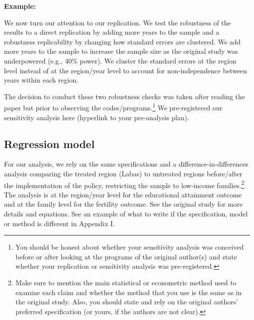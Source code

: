 \documentclass[12pt,a4paper]{article}
\begin{document}

\textbf{Example:} 

We now turn our attention to our replication. We test the robustness of the results to a direct replication by adding more years to the sample and a robustness replicability by changing how standard errors are clustered. We add more years to the sample to increase the sample size as the original study was underpowered (e.g., 40\% power). We cluster the standard errors at the region level instead of at the region/year level to account for non-independence between years within each region.

The decision to conduct these two robustness checks was taken after reading the paper but prior to observing the codes/programs.\footnote{You should be honest about whether your sensitivity analysis was conceived before or after looking at the programs of the original author(s) and state whether your replication or sensitivity analysis was pre-registered.} We pre-registered our sensitivity analysis here (hyperlink to your pre-analysis plan).

\subsection{Regression model}

For our analysis, we rely on the same specifications and a difference-in-differences analysis comparing the treated region (Labas) to untreated regions before/after the implementation of the policy, restricting the sample to low-income families.\footnote{Make sure to mention the main statistical or econometric method used to examine each claim and whether the method that you use is the same as in the original study. Also, you should state and rely on the original authors’ preferred specification (or yours, if the authors are not clear).} The analysis is at the region/year level for the educational attainment outcome and at the family level for the fertility outcome. See the original study for more details and equations. See an example of what to write if the specification, model or method is different in Appendix I.
\end{document}
